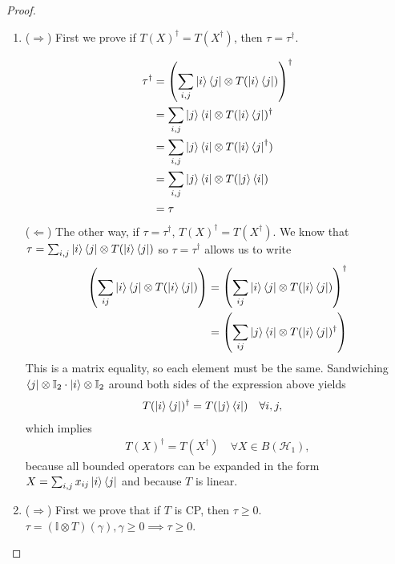 \documentclass[10pt,oneside,longbibliography]{report}
\begin{document}
\begin{tcolorbox}[colframe=black,breakable, colback=black!5, arc=0pt, outer arc=0pt,boxrule=0.5pt]
\begin{proof}
\begin{enumerate}
    \item ($\Rightarrow$) First we prove if $T(X)^{\dagger}=T(X^{\dagger})$, then $\tau=\tau^{\dagger}$.
    
    \begin{align}
        \tau^{\dagger} &= \left(\sum_{i,j}\ket{i}\bra{j} \otimes T(\ket{i}\bra{j})\right)^{\dagger}\\
        &= \sum_{i,j}\ket{j}\bra{i} \otimes T(\ket{i}\bra{j})^{\dagger}\\
        &= \sum_{i,j}\ket{j}\bra{i} \otimes T(\ket{i}\bra{j}^{\dagger})\\
        &=\sum_{i,j}\ket{j}\bra{i} \otimes T(\ket{j}\bra{i})\\
        &= \tau
    \end{align}
    ($\Leftarrow$) The other way, if $\tau = \tau^{\dagger}$, $T(X)^{\dagger}=T(X^{\dagger})$.
    We know that $\tau = \sum_{i,j} \ket{i}\bra{j} \otimes T(\ket{i}\bra{j})$ so $\tau=\tau^{\dagger}$ allows us to write
    \begin{align}
        \left(\sum_{ij} \ket{i}\bra{j} \otimes T(\ket{i}\bra{j})\right)&=\left(\sum_{ij} \ket{i}\bra{j} \otimes T(\ket{i}\bra{j})\right)^{\dagger}\\
        &=\left(\sum_{ij} \ket{j}\bra{i} \otimes T(\ket{i}\bra{j})^{\dagger}\right)
    \end{align}
    This is a matrix equality, so each element must be the same. Sandwiching $\bra{j}\otimes \mathbb{I}_2 \cdot \ket{i}\otimes \mathbb{I}_2$ around both sides of the expression above yields
    \begin{align}
        T(\ket{i}\bra{j})^{\dagger} &= T(\ket{j}\bra{i}) \quad \forall i,j,
    \end{align}
    which implies
    \begin{align}
        T(X)^{\dagger} = T(X^{\dagger}) \quad \forall X\in B(\mathcal{H}_1),
    \end{align}
    because all bounded operators can be expanded in the form $X=\sum_{i,j} x_{ij} \ket{i}\bra{j}$ and because $T$ is linear. 
    
    \item ($\Rightarrow$) First we prove that if $T$ is CP, then $\tau\geq 0$.   $\tau = (\mathbb{I} \otimes T)(\gamma), \gamma \geq 0 \implies \tau \geq 0$.
    

\end{enumerate}
\end{proof}
\end{tcolorbox}
\end{document}
